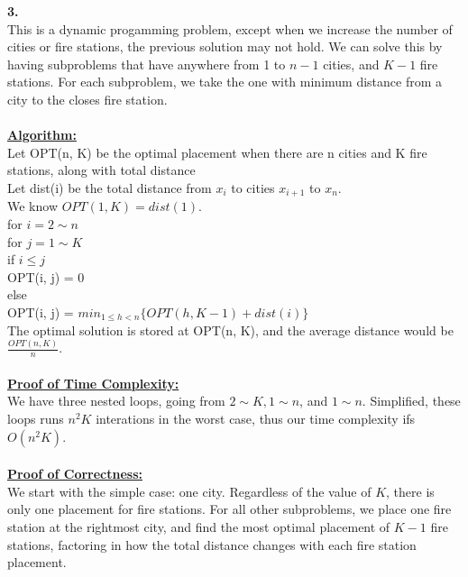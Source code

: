 \documentclass[10pt, letterpaper]{report}
\newcommand\tab[1][1cm]{\hspace*{#1}}
\begin{document}
\newpage
\noindent \large{\textbf{3.} } \\
This is a dynamic progamming problem, except when we increase the number of cities or fire stations, the previous solution may not hold. We can solve this by having subproblems that have anywhere from 1 to $n - 1$ cities, and $K - 1$ fire stations. For each subproblem, we take the one with minimum distance from a city to the closes fire station.\\
\\
\textbf{\underline{Algorithm:}}\\
Let OPT(n, K) be the optimal placement when there are n cities and K fire stations, along with total distance\\
Let dist(i) be the total distance from $x_i$ to cities $x_{i+1}$ to $x_n$. \\
We know \(OPT(1, K) = dist(1)\). \\
for $i = 2 \sim n$\\
\tab for $j = 1 \sim K$\\
\tab\tab if $i \leq j$\\
\tab\tab\tab OPT(i, j) = 0\\
\tab\tab else\\
\tab\tab\tab OPT(i, j) = \(min_{1 \leq h < n} \{OPT(h, K - 1) + dist(i)\}\)\\
The optimal solution is stored at OPT(n, K), and the average distance would be \(\frac{OPT(n,K)}{n}\).\\
\\
\textbf{\underline{Proof of Time Complexity:}}\\
We have three nested loops, going from \(2 \sim K, 1 \sim n\), and \(1 \sim n\). Simplified, these loops runs $n^2K$ interations in the worst case, thus our time complexity ifs $O(n^2K)$.\\
\\
\textbf{\underline{Proof of Correctness:}}\\
We start with the simple case: one city. Regardless of the value of $K$, there is only one placement for fire stations. For all other subproblems, we place one fire station at the rightmost city, and find the most optimal placement of $K - 1$ fire stations, factoring in how the total distance changes with each fire station placement. 
\end{document}
